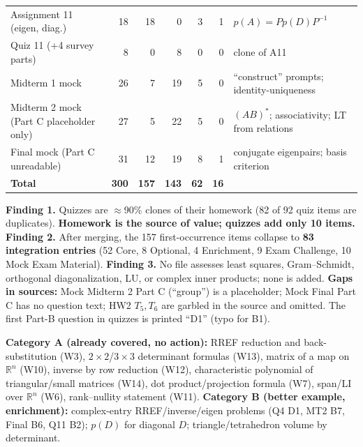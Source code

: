 {\begin{longtable}{@{}p{4.1cm}rrrrr p{6.3cm}@{}}
Assignment 11 (eigen, diag.) & 18 & 18 & 0 & 3 & 1 & $p(A)=Pp(D)P^{-1}$\\
Quiz 11 (+4 survey parts) & 8 & 0 & 8 & 0 & 0 & clone of A11\\\midrule
Midterm 1 mock & 26 & 7 & 19 & 5 & 0 & ``construct'' prompts; identity-uniqueness\\
Midterm 2 mock (Part C placeholder only) & 27 & 5 & 22 & 5 & 0 & $(AB)^*$; associativity; LT from relations\\
Final mock (Part C unreadable) & 31 & 12 & 19 & 8 & 1 & conjugate eigenpairs; basis criterion\\\midrule
\textbf{Total} & \textbf{300} & \textbf{157} & \textbf{143} & \textbf{62} & \textbf{16} & \\\bottomrule
\end{longtable}}
\textbf{Finding 1.} Quizzes are $\approx$90\% clones of their homework (82 of 92 quiz items are duplicates). \textbf{Homework is the source of value; quizzes add only 10 items.} \textbf{Finding 2.} After merging, the 157 first-occurrence items collapse to \textbf{83 integration entries} (52 Core, 8 Optional, 4 Enrichment, 9 Exam Challenge, 10 Mock Exam Material). \textbf{Finding 3.} No file assesses least squares, Gram--Schmidt, orthogonal diagonalization, LU, or complex inner products; none is added. \textbf{Gaps in sources:} Mock Midterm 2 Part C (``group'') is a placeholder; Mock Final Part C has no question text; HW2 $T_5,T_6$ are garbled in the source and omitted. The first Part-B question in quizzes is printed ``D1'' (typo for B1).

\textbf{Category A (already covered, no action):} RREF reduction and back-substitution (W3), $2\times2$/$3\times3$ determinant formulas (W13), matrix of a map on $\mathbb R^n$ (W10), inverse by row reduction (W12), characteristic polynomial of triangular/small matrices (W14), dot product/projection formula (W7), span/LI over $\mathbb R^n$ (W6), rank--nullity statement (W11). \textbf{Category B (better example, enrichment):} complex-entry RREF/inverse/eigen problems (Q4 D1, MT2 B7, Final B6, Q11 B2); $p(D)$ for diagonal $D$; triangle/tetrahedron volume by determinant.
